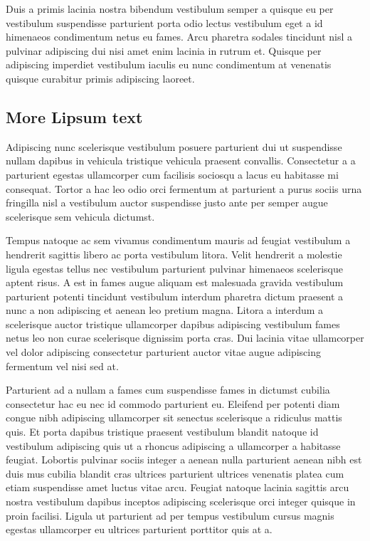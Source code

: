 Duis a primis lacinia nostra bibendum vestibulum semper a quisque eu per vestibulum suspendisse parturient porta odio lectus vestibulum eget a id himenaeos condimentum netus eu fames. Arcu pharetra sodales tincidunt nisl a pulvinar adipiscing dui nisi amet enim lacinia in rutrum et. Quisque per adipiscing imperdiet vestibulum iaculis eu nunc condimentum at venenatis quisque curabitur primis adipiscing laoreet.

\subsection{More Lipsum text}
Adipiscing nunc scelerisque vestibulum posuere parturient dui ut suspendisse nullam dapibus in vehicula tristique vehicula praesent convallis. Consectetur a a parturient egestas ullamcorper cum facilisis sociosqu a lacus eu habitasse mi consequat. Tortor a hac leo odio orci fermentum at parturient a purus sociis urna fringilla nisl a vestibulum auctor suspendisse justo ante per semper augue scelerisque sem vehicula dictumst.

Tempus natoque ac sem vivamus condimentum mauris ad feugiat vestibulum a hendrerit sagittis libero ac porta vestibulum litora. Velit hendrerit a molestie ligula egestas tellus nec vestibulum parturient pulvinar himenaeos scelerisque aptent risus. A est in fames augue aliquam est malesuada gravida vestibulum parturient potenti tincidunt vestibulum interdum pharetra dictum praesent a nunc a non adipiscing et aenean leo pretium magna. Litora a interdum a scelerisque auctor tristique ullamcorper dapibus adipiscing vestibulum fames netus leo non curae scelerisque dignissim porta cras. Dui lacinia vitae ullamcorper vel dolor adipiscing consectetur parturient auctor vitae augue adipiscing fermentum vel nisi sed at.

Parturient ad a nullam a fames cum suspendisse fames in dictumst cubilia consectetur hac eu nec id commodo parturient eu. Eleifend per potenti diam congue nibh adipiscing ullamcorper sit senectus scelerisque a ridiculus mattis quis. Et porta dapibus tristique praesent vestibulum blandit natoque id vestibulum adipiscing quis ut a rhoncus adipiscing a ullamcorper a habitasse feugiat. Lobortis pulvinar sociis integer a aenean nulla parturient aenean nibh est duis mus cubilia blandit cras ultrices parturient ultrices venenatis platea cum etiam suspendisse amet luctus vitae arcu. Feugiat natoque lacinia sagittis arcu nostra vestibulum dapibus inceptos adipiscing scelerisque orci integer quisque in proin facilisi. Ligula ut parturient ad per tempus vestibulum cursus magnis egestas ullamcorper eu ultrices parturient porttitor quis at a.

